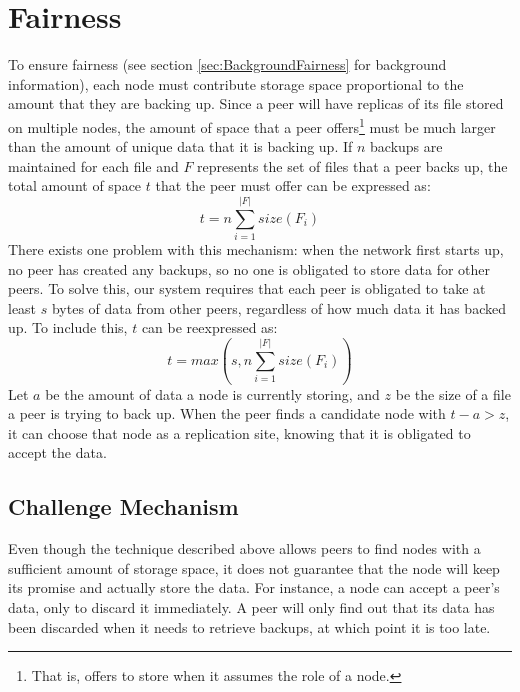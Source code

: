 \documentclass[12pt]{report}
\begin{document}
\section{Fairness} \label{sec:Fairness}
To ensure fairness (see section \ref{sec:BackgroundFairness} for background information), each node must contribute storage space proportional to the amount that they are backing up. Since a peer will have replicas of its file stored on multiple nodes, the amount of space that a peer offers\footnote{That is, offers to store when it assumes the role of a node.} must be much larger than the amount of unique data that it is backing up. If $n$ backups are maintained for each file and $F$ represents the set of files that a peer backs up, the total amount of space $t$ that the peer must offer can be expressed as:
\begin{equation}
t=n\sum\limits_{i=1}^{|F|} size(F_i)
\end{equation}
There exists one problem with this mechanism: when the network first starts up, no peer has created any backups, so no one is obligated to store data for other peers. To solve this, our system requires that each peer is obligated to take at least $s$ bytes of data from other peers, regardless of how much data it has backed up. To include this, $t$ can be reexpressed as:
\begin{equation}
t=max(s,n\sum\limits_{i=1}^{|F|} size(F_i))
\end{equation}
Let $a$ be the amount of data a node is currently storing, and $z$ be the size of a file a peer is trying to back up. When the peer finds a candidate node with $t - a > z$, it can choose that node as a replication site, knowing that it is obligated to accept the data.

\subsection{Challenge Mechanism} \label{subsec:ChallengeMechanism_sec:Fairness_chap:BTBackup}
Even though the technique described above allows peers to find nodes with a sufficient amount of storage space, it does not guarantee that the node will keep its promise and actually store the data. For instance, a node can accept a peer's data, only to discard it immediately. A peer will only find out that its data has been discarded when it needs to retrieve backups, at which point it is too late.
\end{document}
